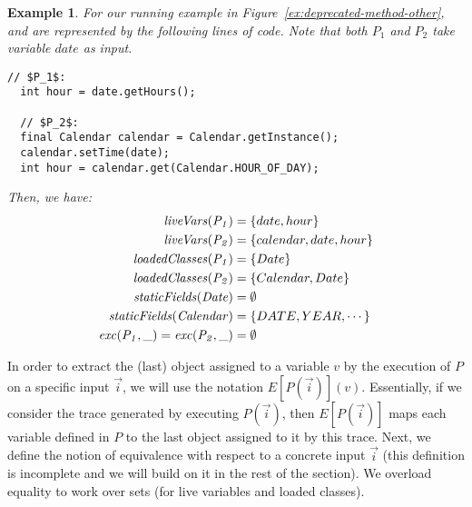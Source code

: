 \documentclass[10pt,conference]{IEEEtran}
\newtheorem{example}{Example}
\begin{document}
\begin{example}\label{ex:defs}
  For our running example in Figure~\ref{ex:deprecated-method-other},
   and  are represented by the following lines of code. Note that
  both $P_1$ and $P_2$ take variable $date$ as input.

\begin{lstlisting}[mathescape=true,showstringspaces=false]
  // $P_1$:
  int hour = date.getHours();

  // $P_2$:
  final Calendar calendar = Calendar.getInstance();
  calendar.setTime(date);
  int hour = calendar.get(Calendar.HOUR_OF_DAY);
\end{lstlisting}
%
Then, we have:
\[
\begin{aligned}[t]
  \mathit{{liveVars(P_1)}} &= \{date, hour\}\\
  \mathit{{liveVars(P_2)}} &= \{calendar, date, hour\}\\  
  \mathit{{loadedClasses(P_1)}} &= \{Date\} \\
  \mathit{{loadedClasses(P_2)}} &= \{Calendar, Date\} \\  
  \mathit{{staticFields(Date)}} &= \emptyset\\
  \mathit{{staticFields(Calendar)}} &= \{DATE, YEAR, \cdots\}\\
  \mathit{{exc(P_1, \_)}}=\mathit{{exc(P_2, \_)}} &=\emptyset
\end{aligned}
\]
\end{example}


In order to extract the (last) object assigned to a variable $v$ by the execution of $P$ on a specific input $\vec{i}$,
we will use the notation $E[P(\vec{i})](v)$. Essentially, if we consider the trace generated by executing $P(\vec{i})$,
then $E[P(\vec{i})]$ maps each variable defined in $P$ to the last object assigned to it by this trace.
Next, we define the notion of equivalence with respect to a concrete input $\vec{i}$ (this definition is incomplete and we will build on it in the rest of the section).
We overload equality to work over sets (for live variables and loaded classes).
\end{document}
